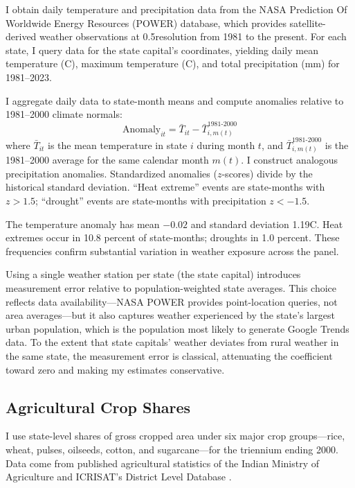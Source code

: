 \documentclass[12pt]{article}
\begin{document}
I obtain daily temperature and precipitation data from the NASA Prediction Of Worldwide Energy Resources (POWER) database, which provides satellite-derived weather observations at 0.5\degree resolution from 1981 to the present. For each state, I query data for the state capital's coordinates, yielding daily mean temperature (\degree C), maximum temperature (\degree C), and total precipitation (mm) for 1981--2023.

I aggregate daily data to state-month means and compute anomalies relative to 1981--2000 climate normals:
\begin{equation}
\text{Anomaly}_{it} = \bar{T}_{it} - \bar{T}_{i,m(t)}^{1981\text{-}2000}
\end{equation}
where $\bar{T}_{it}$ is the mean temperature in state $i$ during month $t$, and $\bar{T}_{i,m(t)}^{1981\text{-}2000}$ is the 1981--2000 average for the same calendar month $m(t)$. I construct analogous precipitation anomalies. Standardized anomalies ($z$-scores) divide by the historical standard deviation. ``Heat extreme'' events are state-months with $z > 1.5$; ``drought'' events are state-months with precipitation $z < -1.5$.

The temperature anomaly has mean $-0.02$ and standard deviation 1.19\degree C. Heat extremes occur in 10.8 percent of state-months; droughts in 1.0 percent. These frequencies confirm substantial variation in weather exposure across the panel.

Using a single weather station per state (the state capital) introduces measurement error relative to population-weighted state averages. This choice reflects data availability---NASA POWER provides point-location queries, not area averages---but it also captures weather experienced by the state's largest urban population, which is the population most likely to generate Google Trends data. To the extent that state capitals' weather deviates from rural weather in the same state, the measurement error is classical, attenuating the coefficient toward zero and making my estimates conservative.

\subsection{Agricultural Crop Shares}

I use state-level shares of gross cropped area under six major crop groups---rice, wheat, pulses, oilseeds, cotton, and sugarcane---for the triennium ending 2000. Data come from published agricultural statistics of the Indian Ministry of Agriculture and ICRISAT's District Level Database \citep{icrisat2023}.
\end{document}
